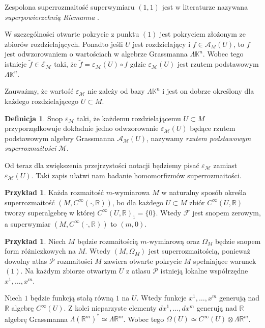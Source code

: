 \documentclass[11pt,a4paper]{report}
\theoremstyle{definition}
\newtheorem{example}[theorem]{Przykład}
\newtheorem{definition}[theorem]{Definicja}
\begin{document}
Zespolona superrozmaitość superwymiaru $(1,1)$ jest w literaturze nazywana \textit{superpowierzchnią Riemanna} \cite{friedan}. 

W szczególności otwarte pokrycie z punktu $(1)$ jest pokryciem złożonym ze zbiorów rozdzielających. Ponadto jeśli $U$ jest rozdzielający i $f \in \mathcal{A}_M(U)$, to $f$ jest odwzorowaniem o wartościach w algebrze Grassmanna $\Lambda \mathbb{K}^n$. Wobec tego istnieje $\tilde{f} \in \mathcal{E}_\mathcal{M}$ taki, że $\tilde{f} = \varepsilon_\mathcal{M}(U) \circ f$ gdzie $\varepsilon_\mathcal{M}(U)$ jest rzutem podstawowym $\Lambda \mathbb{K}^n$.

Zauważmy, że wartość $\varepsilon_\mathcal{M}$ nie zależy od bazy $\Lambda \mathbb{K}^n$ i jest on dobrze określony dla każdego rozdzielającego $U \subset M$.

\begin{definition}
 Snop $\varepsilon_\mathcal{M}$ taki, że każdemu rozdzielającemu $U \subset M$ przyporządkowuje dokładnie jedno odwzorowanie $\varepsilon_\mathcal{M} (U)$ będące rzutem podstawowym algebry Grassmanna $\mathcal{A}_\mathcal{M} (U)$, nazywamy \textit{rzutem podstawowym superrozmaitości} $\mathcal{M}$.
\end{definition}

Od teraz dla zwiększenia przejrzystości notacji będziemy pisać $\varepsilon_\mathcal{M}$ zamiast $\varepsilon_\mathcal{M} (U)$. Taki zapis ułatwi nam badanie homomorfizmów superrozmaitości.

\begin{example}
Każda rozmaitość $m$-wymiarowa $M$ w naturalny sposób określa superrozmaitość $(M,C^\infty(\cdot, \mathbb{R}))$, bo dla każdego $U\subset M$ zbiór $C^\infty (U, \mathbb{R})$ tworzy superalgebrę w której $C^\infty (U, \mathbb{R})_1 = \{ 0 \}$. Wtedy $\mathcal{F}$ jest snopem zerowym, a superwymiar $(M,C^\infty(\cdot, \mathbb{R}))$ to $(m,0)$.
\end{example}

\begin{example}
Niech $M$ będzie rozmaitością $m$-wymiarową oraz $\Omega_M$ będzie snopem form różniczkowych na $M$. Wtedy $(M, \Omega_M)$ jest superrozmaitością, ponieważ dowolny atlas $\mathcal{P}$ rozmaitości $M$ zawiera otwarte pokrycie $M$ spełniające warunek $(1)$. Na każdym zbiorze otwartym $U$ z atlasu $\mathcal{P}$ istnieją lokalne współrzędne $x^1, \ldots, x^m$. 

Niech $1$ będzie funkcją stałą równą $1$ na $U$. Wtedy funkcje $x^1, \ldots, x^m$ generują nad $\mathbb{R}$ algebrę $C^\infty (U)$. Z kolei nieparzyste elementy $dx^1, \ldots, dx^m$ generują nad $\mathbb{R}$ algebrę Grassmanna $\Lambda (\mathbb{R}^m)^* \simeq \Lambda \mathbb{R}^m$. Wobec tego $\Omega(U) \simeq C^\infty (U) \otimes \Lambda \mathbb{R}^m$.
\end{example}
\end{document}
